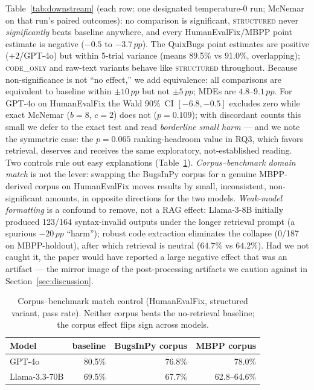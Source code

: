 \documentclass[10pt,conference]{IEEEtran}
\newcommand{\structured}{\textsc{structured}\xspace}
\newcommand{\codeonly}{\textsc{code\_only}\xspace}
\newcommand{\pp}{\,pp}
\begin{document}
Table~\ref{tab:downstream} (each row: one designated temperature-0 run;
McNemar on that run's paired outcomes): no comparison is significant,
\structured never \emph{significantly} beats baseline anywhere, and every
HumanEvalFix/MBPP point estimate is negative ($-0.5$ to $-3.7\pp$). The
QuixBugs point estimates are positive ($+2$/GPT-4o) but within 5-trial
variance (means 89.5\% vs 91.0\%, overlapping); \codeonly and raw-text
variants behave like \structured throughout. Because non-significance is
not ``no effect,'' we add equivalence: all comparisons are equivalent to
baseline within $\pm 10\pp$ but not $\pm 5\pp$; MDEs are $4.8$--$9.1\pp$.
For GPT-4o on HumanEvalFix the Wald 90\%~CI $[-6.8,-0.5]$ excludes zero
while exact McNemar ($b{=}8$, $c{=}2$) does not ($p{=}0.109$); with
discordant counts this small we defer to the exact test and read
\emph{borderline small harm} --- and we note the symmetric case: the
$p{=}0.065$ ranking-headroom value in RQ3, which favors retrieval, deserves
and receives the same exploratory, not-established reading. Two controls rule out easy explanations (Table~\ref{tab:controls}).
\emph{Corpus--benchmark domain match} is not the lever: swapping the
BugsInPy corpus for a genuine MBPP-derived corpus on HumanEvalFix moves
results by small, inconsistent, non-significant amounts, in opposite
directions for the two models. \emph{Weak-model formatting} is a confound
to remove, not a RAG effect: Llama-3-8B initially produced 123/164
syntax-invalid outputs under the longer retrieval prompt (a spurious
$-20\pp$ ``harm''); robust code extraction eliminates the collapse (0/187
on MBPP-holdout), after which retrieval is neutral ($64.7\%$ vs $64.2\%$).
Had we not caught it, the paper would have reported a large negative effect
that was an artifact --- the mirror image of the post-processing artifacts
we caution against in Section~\ref{sec:discussion}.

\begin{table}[!t]
\caption{Corpus--benchmark match control (HumanEvalFix, structured
variant, pass rate). Neither corpus beats the no-retrieval baseline; the
corpus effect flips sign across models.}
\label{tab:controls}
\centering
\begin{tabular}{lrrr}
\toprule
Model & baseline & BugsInPy corpus & MBPP corpus \\
\midrule
GPT-4o & 80.5\% & 76.8\% & 78.0\% \\
Llama-3.3-70B & 69.5\% & 67.7\% & 62.8--64.6\% \\
\bottomrule
\end{tabular}
\end{table}
\end{document}
